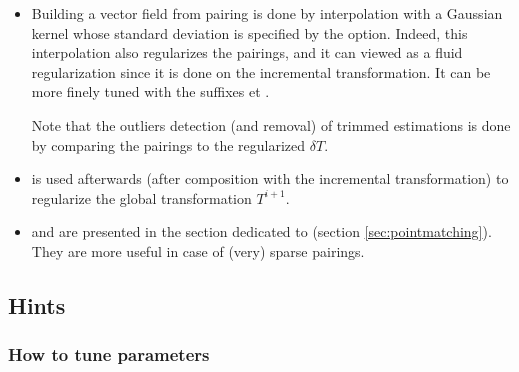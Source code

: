 \begin{itemize}
\item[] Building a vector field from pairing is done by interpolation with a Gaussian kernel whose standard deviation is specified by the  option. Indeed, this interpolation also regularizes the pairings, and it can viewed as a fluid regularization since it is done on the incremental transformation.  It can be more finely tuned with the suffixes  et . 

Note that the outliers detection (and removal) of trimmed estimations is done by comparing the pairings to the regularized $\delta T$.

\item[]  is used afterwards (after composition with the incremental transformation) to regularize the global transformation $T^{i+1}$.

\item[]  and  are presented in the section dedicated to \pointmatching (section \ref{sec:pointmatching}). They are more useful in case of (very) sparse pairings.

\end{itemize}





\subsection{Hints}

\subsubsection{How to tune parameters}

